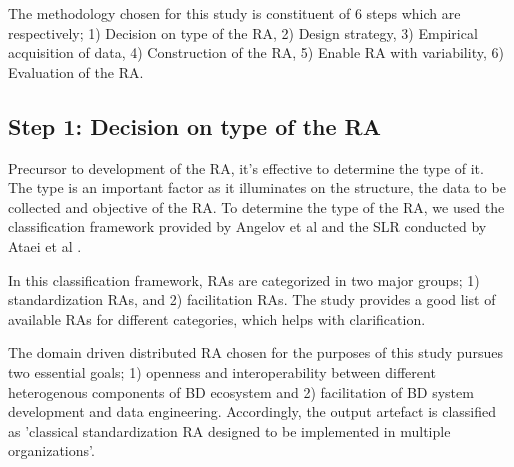 \documentclass[runningheads]{llncs}
\begin{document}
The methodology chosen for this study is constituent of 6 steps which are respectively; 1) Decision on type of the RA, 2) Design strategy, 3) Empirical acquisition of data, 4) Construction of the RA, 5) Enable RA with variability, 6) Evaluation of the RA. 



\subsection{Step 1: Decision on type of the RA}
Precursor to development of the RA, it's effective to determine the type of it. The type is an important factor as it illuminates on the structure, the data to be collected and objective of the RA. To determine the type of the RA, we used the classification framework provided by Angelov et al \cite{angelov2009classification} and the SLR conducted by Ataei et al \cite{AtaeiACIS}. 


In this classification framework, RAs are categorized in two major groups; 1) standardization RAs, and 2) facilitation RAs. The study provides a good list of available RAs for different categories, which helps with clarification. 

The domain driven distributed RA chosen for the purposes of this study pursues two essential goals; 1) openness and interoperability between different heterogenous components of BD ecosystem and 2) facilitation of BD system development and data engineering. Accordingly, the output artefact is classified as 'classical standardization RA designed to be implemented in multiple organizations'. 
\end{document}
